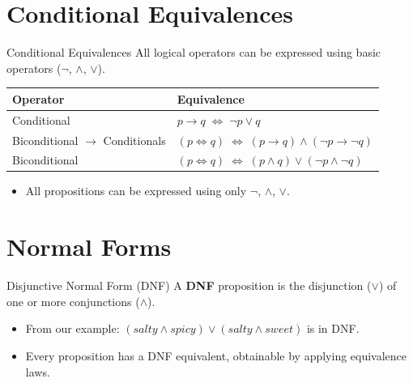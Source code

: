 \documentclass[aspectratio=169]{beamer}
\newcommand{\Iff}{\Leftrightarrow}
\begin{document}
\section{Conditional Equivalences}

\begin{frame}{Conditional Equivalences}
  All logical operators can be expressed using basic operators
  ($\lnot$, $\land$, $\lor$).

  \medskip
  \renewcommand{\arraystretch}{1.35}
  \begin{tabular}{ll}
    \toprule
    \textbf{Operator} & \textbf{Equivalence} \\
    \midrule
    Conditional
      & $p \to q \;\Iff\; \lnot p \lor q$ \\[4pt]
    Biconditional $\to$ Conditionals
      & $(p \Iff q)
         \;\Iff\;
         (p \to q) \land (\lnot p \to \lnot q)$ \\[4pt]
    Biconditional
      & $(p \Iff q)
         \;\Iff\;
         (p \land q) \lor (\lnot p \land \lnot q)$ \\
    \bottomrule
  \end{tabular}

  \bigskip
  \begin{itemize}
    \item All propositions can be expressed using only $\lnot$, $\land$, $\lor$.
  \end{itemize}
\end{frame}

\section{Normal Forms}

\begin{frame}{Disjunctive Normal Form (DNF)}
  A \textbf{DNF} proposition is the disjunction ($\lor$) of one or more
  conjunctions ($\land$).

  \bigskip
  \begin{itemize}
    \item From our example:
          $(\mathit{salty} \land \mathit{spicy})
            \lor (\mathit{salty} \land \mathit{sweet})$
          \quad\textcolor{dmOrange}{is in DNF.}
    \bigskip
    \item Every proposition has a DNF equivalent,
          obtainable by applying equivalence laws.
  \end{itemize}
\end{frame}
\end{document}
